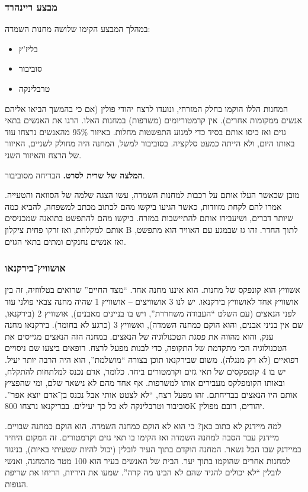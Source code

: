 \documentclass[a4paper]{book}
\begin{document}
	\subsubsection{מבצע ריינהרד}
	במהלך המבצע הקימו שלושה מחנות השמדה: 
	\begin{itemize}
		\item בליז'ץ
		\item סוביבור
		\item טרבלינקה
	\end{itemize}
	המחנות הללו הוקמו בחלק המזרחי, ונועדו לרצח יהודי פולין (אם כי בהמשך הביאו אליהם אנשים ממקומות אחרים). אין קרמטוריומים (משרפות) במחנות האלו. הרגו את האנשים בתאי גזים ואז כיסו אותם בסיד כדי למנוע התפשטות מחלות. באיזור 95\% מהאנשים נרצחו עוד באותו היום, ולא הייתה כמעט סלקציה. בסוביבור למשל, המחנה היה מחולק לשניים, האיזור של הרצח והאיזור השני. 
	
	\textbf{המלצה של שרית לסרט. }הבריחה מסוביבור. 
	
	
	מובן שכאשר העלו אותם על רכבות למחנות השמדה, עשו הצגה שלמה של הסוואה והטעייה. אמרו להם לקחת מזוודות, כאשר הגיעו ביקשו מהם לכתוב מכתב למשפחה, להביא כמה שיותר דברים, ושיעבירו אותם להתיישבות במזרח. ביקשו מהם להתפשט בתואנה שמכניסים אותם למקלחת, ואז זרקו פחית ציקלון B לתוך החדר. זהו גז שבמגע עם האוויר הוא מתפשט, ואז אנשים נחנקים ומתים בתאי הגזים. 
	
	\subsubsection{אושוויץ־בירקנאו}
	אשוויץ הוא קונפקס של מחנות. הוא איננו מחנה אחד. ``מצד החיים'' שרואים בטלווזיה, זה בין אושוויץ אחד לאושוויץ בירקנאו. יש לנו 3 אושוויצים – אושוויץ 1 שהיה מחנה צבאי פולני עוד לפני הנאצים (עם השלט ``העבודה משחררת'', ויש בו בניינים מאבנים), אושוויץ 2 (בירקנאו, שם אין בניני אבנים, והוא הוקם כמחנה השמדה), ואשוויץ 3 (כרגע לא בחומר). בירקנאו מחנה ענק, והוא מהווה את פסגת הטכנולוגיה של הנאצים. במחנה הזה הנאצים מגייסים את הטכנולוגיה הכי מתקדמת של התקופה, כדי לבנות מפעל לרצח. רופאים ביצעו שם ניסויים רפואיים (לא רק מנגלה). משום שבירקנאו תוכן בצורה ``מושלמת'', הוא היה הרבה יותר יעיל. יש בו 4 קומפקסים של תאי גזים וקרמטורים ביחד. כלומר, אדם נכנס למלתחות להתקלח, ובאותו הקומפלקס מעבירים אותו למשרפות. אף אחד מהם לא נישאר שלם, ומי שהפציץ אותם היו הנאצים בבריחתם. זהו מפעל רצח, ``לא לצטט אותי אבל נכנס בן־אדם יוצא אפר''. סוביבור וטרבלינקה לא כל כך יעילים. בבריקנאו נרצחו 800K יהודים, רובם מפולין. 
	
	למה מיידנק לא כתוב כאן? כי הוא לא הוקם כמחנה השמדה. הוא הוקם כמחנה שבויים. מיידנק עבר הסבה למחנה השמדה ואז הקימו בו תאי גזים וקרמטורים. זה המקום היחיד במיידנק שבו הכל נשאר. המחנה הוקדם בתוך העיר לובלין (יכול להיות שטעיתי באיות), בניגוד למחנות אחרים שהוקמו בתוך יער. הבית של האנשים בעיר הוא 100 מטר מהמחנה, ואנשי לובלין ``לא יכולים להגיד שהם לא הבינו מה קרה''. שמעו את היריות, הריחו את שריפת הגופות. 
	
\end{document}
